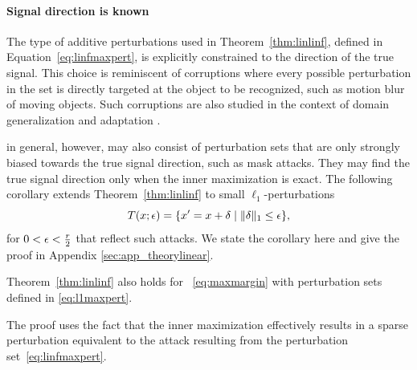 \paragraph{Signal direction is known}
The type of additive perturbations used in Theorem~\ref{thm:linlinf},
defined in Equation~\eqref{eq:linfmaxpert}, is explicitly constrained
to the direction of the true signal. This choice is reminiscent of
corruptions where every possible perturbation in the set is directly
targeted at the object to be recognized, such as motion blur of moving
objects.  Such corruptions are also studied in the context of domain
generalization and adaptation \cite{Schneider20}.

\nameofattackscapital in general, however, may also consist of
perturbation sets that are only strongly biased towards the true
signal direction, such as mask attacks.  They may find the true signal
direction only when the inner maximization is
exact. The following corollary extends Theorem~\ref{thm:linlinf} to
small $\ell_1$-perturbations
\begin{equation}
  \label{eq:l1maxpert}
  T({x};{\epsilon}) = \{x'=x+\delta \mid \|\delta\|_1 \leq \epsilon\},
\end{equation}
for $0<\epsilon<\frac{r}{2}$ that reflect such attacks. We state the corollary here and give the proof in Appendix \ref{sec:app_theorylinear}.
\begin{corollary}
\label{cor:l1extension}
  Theorem~\ref{thm:linlinf} also holds for ~\eqref{eq:maxmargin} with perturbation sets defined in \eqref{eq:l1maxpert}.
\end{corollary}
The proof uses the fact that the inner maximization
effectively results in a sparse perturbation equivalent to the attack
resulting from the perturbation set~\eqref{eq:linfmaxpert}. 

